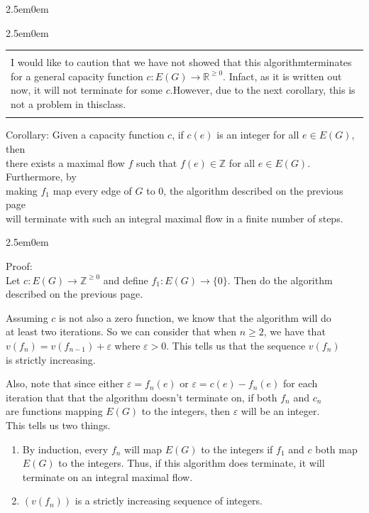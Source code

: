 \documentclass{book}
\newcommand{\hThree}{%
   \color{PineGreen}
   \fontsize{13}{15}\selectfont%
}
\newcommand{\myComment}{%
   \color{RawerSienna}%
   \fontsize{12}{14}\selectfont%
}
\newenvironment{myIndent}{%
   \begin{adjustwidth}{2.5em}{0em}%
}{%
   \end{adjustwidth}%
}
\newcommand{\uuline}[2][.]{%
{\vphantom{a}\color{#1}%
\rlap{\rule[-0.18em]{\widthof{#2}}{0.06em}}%
\rlap{\rule[-0.32em]{\widthof{#2}}{0.06em}}}%
#2}
\newenvironment{myClosureOne}[2][.]{%
   \color{#1}%
   \begin{tabular}{|p{#2in}|} \hline \\%
}{%
   \\ \hline \end{tabular}%
}
\newcommand{\retTwo}{\hfill\bigbreak}
\begin{document}
{\begin{myIndent}
{\begin{myIndent}
{\begin{center}
\begin{myClosureOne}{4.5}
            {\myComment I would like to caution that we have not showed that this algorithm\newline terminates for a general capacity function $c: E(G) \rightarrow \mathbb{R}^{\geq 0}$. In\newline fact, as it is written out now, it will not terminate for some $c$.\newline However, due to the next corollary, this is not a problem in this\newline class.} \\[-2pt]
         \end{myClosureOne}
      \end{center}}
   \end{myIndent}}

   \newpage

   \uuline{Corollary}: Given a capacity function $c$, if $c(e)$ is an integer for all $e \in E(G)$, then\\ there exists a maximal flow $f$ such that $f(e) \in \mathbb{Z}$ for all $e \in E(G)$. Furthermore, by\\ making  $f_1$ map every edge of $G$ to $0$, the algorithm described on the previous page\\ will terminate with such an integral maximal flow in a finite number of steps.
   
   {\begin{myIndent} \hThree
      Proof:\\
      Let $c: E(G) \rightarrow \mathbb{Z}^{\geq 0}$ and define $f_1: E(G) \rightarrow \{0\}$. Then do the algorithm described on the previous page.\retTwo

      Assuming $c$ is not also a zero function, we know that the algorithm will do\\ at least two iterations. So we can consider that when $n \geq 2$, we have that\\ $v(f_n) = v(f_{n-1}) + \varepsilon$ where $\varepsilon > 0$. This tells us that the sequence $v(f_n)$\\ is strictly increasing.\retTwo

      Also, note that since either $\varepsilon = f_n(e)$ or $\varepsilon = c(e) - f_n(e)$ for each\\ iteration that that the algorithm doesn't terminate on, if both $f_n$ and $c_n$\\ are functions mapping $E(G)$ to the integers, then $\varepsilon$ will be an integer.\\ This tells us two things.
      \begin{enumerate}
         \item By induction, every $f_n$ will map $E(G)$ to the integers if $f_1$ and $c$ both map\\ $E(G)$ to the integers. Thus, if this algorithm does terminate, it will\\ terminate on an integral maximal flow.
         \item $(v(f_n))$ is a strictly increasing sequence of integers.\retTwo
      \end{enumerate}


\end{myIndent}}
\end{myIndent}}
\end{document}
